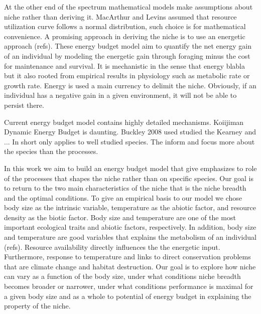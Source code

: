 At the other end of the spectrum mathematical models make assumptions about niche rather than deriving it. 
MacArthur and Levins assumed that resource utilization curve follows a normal distribution, such choice is for mathematical convenience. 
A promising approach in deriving the niche is to use an energetic approach (refs).
These energy budget model aim to quantify the net energy gain of an individual by modeling the energetic gain through foraging minus the cost for maintenance and survival.
It is mechanistic in the sense that energy blabla but it also rooted from empirical results in physiology such as metabolic rate or growth rate.
Energy is used a main currency to delimit the niche. 
Obviously, if an individual has a negative gain in a given environment, it will not be able to persist there.

Current energy budget model contains highly detailed mechanisms.
Koiijiman Dynamic Energy Budget is daunting.
Buckley 2008 used studied the 
Kearney and ...
In short only applies to well studied species. 
The inform and focus more about the species than the processes.

In this work we aim to build an energy budget model that give emphasizes to role of the processes that shapes the niche rather than on specific species.
Our goal is to return to the two main characteristics of the niche that is the niche breadth and the optimal conditions.
To give an empirical basis to our model we chose body size as the intrinsic variable, temperature as the abiotic factor, and resource density as the biotic factor.
Body size and temperature are one of the most important ecological traits and abiotic factors, respectively.
In addition, body size and temperature are good variables that explains the metabolism of an individual (refs).
Resource availability directly influences the the energetic input. 
Furthermore, response to temperature and links to direct conservation problems that are climate change and habitat destruction.
Our goal is to explore how niche can vary as a function of the body size, under what conditions niche breadth becomes broader or narrower, under what conditions performance is maximal for a given body size and as a whole to potential of energy budget in explaining the property of the niche.


